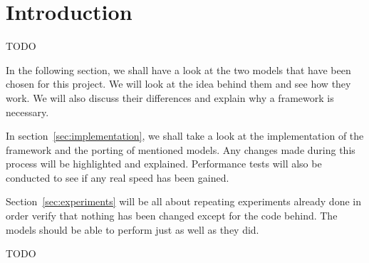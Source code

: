 \section{Introduction}

TODO

In the following section, we shall have a look at the two models that have been chosen for this project. We will look at the idea behind them and see how they work. We will also discuss their differences and explain why a framework is necessary.

In section~\ref{sec:implementation}, we shall take a look at the implementation of the framework and the porting of mentioned models. Any changes made during this process will be highlighted and explained. Performance tests will also be conducted to see if any real speed has been gained.

Section~\ref{sec:experiments} will be all about repeating experiments already done in order verify that nothing has been changed except for the code behind. The models should be able to perform just as well as they did.

TODO
